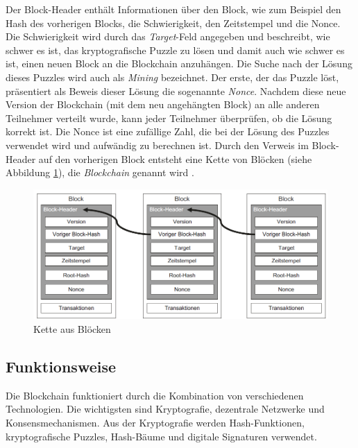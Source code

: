 \noindent Der Block-Header enthält Informationen über den Block, wie zum Beispiel den Hash des vorherigen Blocks, die Schwierigkeit, den Zeitstempel und die Nonce. Die Schwierigkeit wird durch das \textit{Target}-Feld angegeben und beschreibt, wie schwer es ist, das kryptografische Puzzle zu lösen und damit auch wie schwer es ist, einen neuen Block an die Blockchain anzuhängen. Die Suche nach der Lösung dieses Puzzles wird auch als \textit{Mining} bezeichnet. Der erste, der das Puzzle löst, präsentiert als Beweis dieser Lösung die sogenannte \textit{Nonce}. Nachdem diese neue Version der Blockchain (mit dem neu angehängten Block) an alle anderen Teilnehmer verteilt wurde, kann jeder Teilnehmer überprüfen, ob die Lösung korrekt ist. Die Nonce ist eine zufällige Zahl, die bei der Lösung des Puzzles verwendet wird und aufwändig zu berechnen ist. Durch den Verweis im Block-Header auf den vorherigen Block entsteht eine Kette von Blöcken (siehe Abbildung \ref{fig:chain_of_blocks}), die \textit{Blockchain} genannt wird \parencite[S. 10-12]{Fill_BlockchainGrundlagen}.

\begin{figure}[H]
    \centering
    \includegraphics[width=0.9\linewidth]{images/chain_of_blocks.png}
    \caption{Kette aus Blöcken \parencite[S. 12]{Fill_BlockchainGrundlagen}}
    \label{fig:chain_of_blocks}
\end{figure}


\subsection{Funktionsweise}
\label{subsec:blockchain_funktionsweise}

Die Blockchain funktioniert durch die Kombination von verschiedenen Technologien. Die wichtigsten sind Kryptografie, dezentrale Netzwerke und Konsensmechanismen. Aus der Kryptografie werden Hash-Funktionen, kryptografische Puzzles, Hash-Bäume und digitale Signaturen verwendet.

